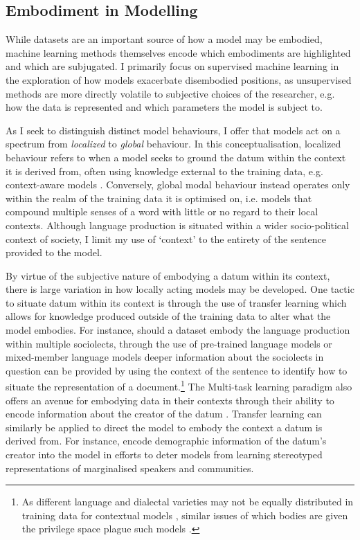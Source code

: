 \subsection{Embodiment in Modelling}

While datasets are an important source of how a model may be embodied, machine learning methods themselves encode which embodiments are highlighted and which are subjugated. I primarily focus on supervised machine learning in the exploration of how models exacerbate disembodied positions, as unsupervised methods are more directly volatile to subjective choices of the researcher, e.g. how the data is represented and which parameters the model is subject to.

As I seek to distinguish distinct model behaviours, I offer that models act on a spectrum from \textit{localized} to \textit{global} behaviour. In this conceptualisation, localized behaviour refers to when a model seeks to ground the datum within the context it is derived from, often using knowledge external to the training data, e.g. context-aware models \citep{Garcia:2019,Devlin:2019}. Conversely, global modal behaviour instead operates only within the realm of the training data it is optimised on, i.e. models that compound multiple senses of a word with little or no regard to their local contexts. Although language production is situated within a wider socio-political context of society, I limit my use of `context' to the entirety of the sentence provided to the model.

By virtue of the subjective nature of embodying a datum within its context, there is large variation in how locally acting models may be developed. One tactic to situate datum within its context is through the use of transfer learning which allows for knowledge produced outside of the training data to alter what the model embodies. For instance, should a dataset embody the language production within multiple sociolects, through the use of pre-trained language models \citep{Devlin:2019} or mixed-member language models \citep{Blodgett:2016} deeper information about the sociolects in question can be provided by using the context of the sentence to identify how to situate the representation of a document.\footnote{As different language and dialectal varieties may not be equally distributed in training data for contextual models \citep{Dunn:2020}, similar issues of which bodies are given the privilege space plague such models \citep{Tan-Celis:2019}.} The Multi-task learning paradigm also offers an avenue for embodying data in their contexts through their ability to encode information about the creator of the datum \citep{Benton:2017,Garcia:2019}. Transfer learning can similarly be applied to direct the model to embody the context a datum is derived from. For instance, \citet{Romanov:2019} encode demographic information of the datum's creator into the model in efforts to deter models from learning stereotyped representations of marginalised speakers and communities.

